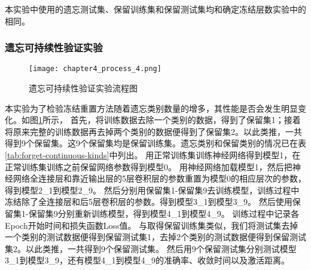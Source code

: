 本实验中使用的遗忘测试集、保留训练集和保留测试集均和确定冻结层数实验中的相同。




\subsubsection{遗忘可持续性验证实验}
\begin{figure}
    \centering
    \texttt{[image: chapter4\_process\_4.png]}
    \caption{遗忘可持续性验证实验流程图}
    \label{fig:chapter4_process_4}
\end{figure}

本实验为了检验冻结重置方法随着遗忘类别数量的增多，其性能是否会发生明显变化。如图\ref{fig:chapter4_process_4}所示，
首先，将训练数据去除一个类别的数据，得到了保留集1；接着将原来完整的训练数据再去掉两个类别的数据便得到了保留集2。以此类推，一共得到9个保留集。这9个保留集均是保留训练集。遗忘类别和保留类别的情况已在表\ref{tab:forget-continuous-kinds}中列出。
用正常训练集训练神经网络得到模型1，在正常训练集训练之前保留网络参数得到模型0。
用神经网络加载模型1，然后把神经网络全连接层和靠近输出层的5层卷积层的参数重置为模型0的相应层次的参数，得到模型2\_1到模型2\_9。
然后分别用保留集1-保留集9去训练模型，训练过程中冻结除了全连接层和后5层卷积层的参数。得到模型3\_1到模型3\_9。
然后使用保留集1-保留集9分别重新训练模型，得到模型4\_1到模型4\_9。
训练过程中记录各Epoch开始时间和损失函数Loss值。
与取得保留训练集类似，我们将测试集去掉一个类别的测试数据便得到保留测试集1，去掉2个类别的测试数据便得到保留测试集2。以此类推，一共得到9个保留测试集。
然后用9个保留测试集分别测试模型3\_1到模型3\_9，还有模型4\_1到模型4\_9的准确率、收敛时间以及激活距离。

